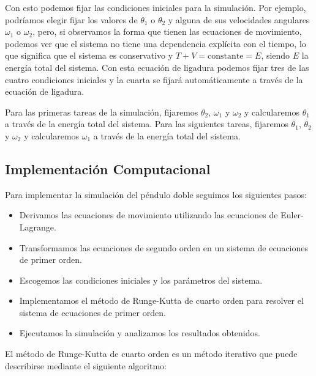 \documentclass[10pt,onecolumn]{article}
\begin{document}
Con esto podemos fijar las condiciones iniciales para la simulación. Por ejemplo, podríamos elegir fijar los valores de $\theta_1$ o $\theta_2$ y alguna de sus velocidades angulares $\omega_1$ o $\omega_2$, pero, si observamos la forma que tienen las ecuaciones de movimiento, podemos ver que el sistema no tiene una dependencia explícita con el tiempo, lo que significa que el sistema es conservativo y $T + V = \text{constante} = E$, siendo $E$ la energía total del sistema. Con esta ecuación de ligadura podemos fijar tres de las cuatro condiciones iniciales y la cuarta se fijará automáticamente a través de la ecuación de ligadura. 

Para las primeras tareas de la simulación, fijaremos $\theta_2$, $\omega_1$ y $\omega_2$ y calcularemos $\theta_1$ a través de la energía total del sistema. Para las siguientes tareas, fijaremos $\theta_1$, $\theta_2$ y $\omega_2$ y calcularemos $\omega_1$ a través de la energía total del sistema.



\subsection{Implementación Computacional}

Para implementar la simulación del péndulo doble seguimos los siguientes pasos:

\begin{itemize}
\item Derivamos las ecuaciones de movimiento utilizando las ecuaciones de Euler-Lagrange.
\item Transformamos las ecuaciones de segundo orden en un sistema de ecuaciones de primer orden.
\item Escogemos las condiciones iniciales y los parámetros del sistema.
\item Implementamos el método de Runge-Kutta de cuarto orden para resolver el sistema de ecuaciones de primer orden.
\item Ejecutamos la simulación y analizamos los resultados obtenidos.
\end{itemize}

El método de Runge-Kutta de cuarto orden es un método iterativo que puede describirse mediante el siguiente algoritmo:
    
\begin{algorithm}[H]
\SetAlgoLined
{}
\caption{Algoritmo de Runge-Kutta de cuarto orden.}
\end{algorithm}
\end{document}

